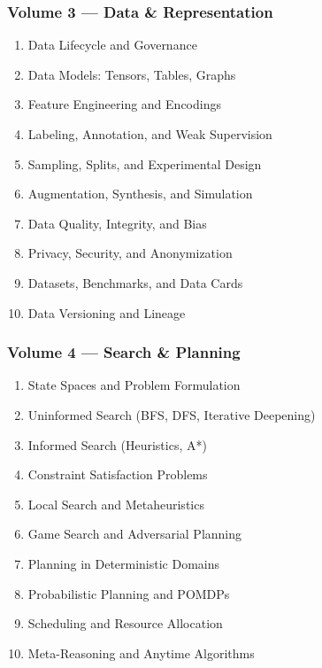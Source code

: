 \documentclass[
  letterpaper,
  DIV=11,
  numbers=noendperiod]{scrreprt}
\providecommand{\tightlist}{%
  \setlength{\itemsep}{0pt}\setlength{\parskip}{0pt}}
\begin{document}
\subsubsection{Volume 3 --- Data \&
Representation}\label{volume-3-data-representation}

\begin{enumerate}
\def\labelenumi{\arabic{enumi}.}
\setcounter{enumi}{20}
\tightlist
\item
  Data Lifecycle and Governance
\item
  Data Models: Tensors, Tables, Graphs
\item
  Feature Engineering and Encodings
\item
  Labeling, Annotation, and Weak Supervision
\item
  Sampling, Splits, and Experimental Design
\item
  Augmentation, Synthesis, and Simulation
\item
  Data Quality, Integrity, and Bias
\item
  Privacy, Security, and Anonymization
\item
  Datasets, Benchmarks, and Data Cards
\item
  Data Versioning and Lineage
\end{enumerate}

\subsubsection{Volume 4 --- Search \&
Planning}\label{volume-4-search-planning}

\begin{enumerate}
\def\labelenumi{\arabic{enumi}.}
\setcounter{enumi}{30}
\tightlist
\item
  State Spaces and Problem Formulation
\item
  Uninformed Search (BFS, DFS, Iterative Deepening)
\item
  Informed Search (Heuristics, A*)
\item
  Constraint Satisfaction Problems
\item
  Local Search and Metaheuristics
\item
  Game Search and Adversarial Planning
\item
  Planning in Deterministic Domains
\item
  Probabilistic Planning and POMDPs
\item
  Scheduling and Resource Allocation
\item
  Meta-Reasoning and Anytime Algorithms
\end{enumerate}
\end{document}
